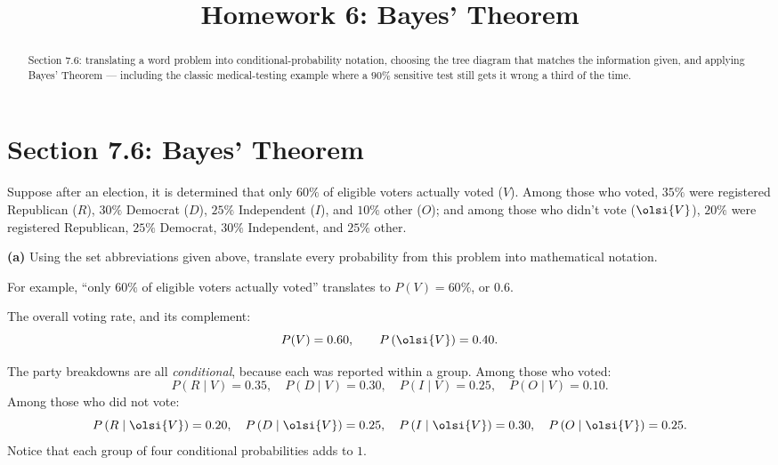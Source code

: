 \documentclass[12pt]{ximera}
\title{Homework 6: Bayes' Theorem}
\begin{document}
\begin{abstract}
Section 7.6: translating a word problem into conditional-probability notation,
choosing the tree diagram that matches the information given, and applying Bayes'
Theorem --- including the classic medical-testing example where a $90\%$ sensitive
test still gets it wrong a third of the time.
\end{abstract}
\maketitle

\section*{Section 7.6: Bayes' Theorem}

\begin{problem}
Suppose after an election, it is determined that only $60\%$ of eligible voters
actually voted ($V$). Among those who voted, $35\%$ were registered Republican
($R$), $30\%$ Democrat ($D$), $25\%$ Independent ($I$), and $10\%$ other ($O$);
and among those who didn't vote ($\olsi{V}$), $20\%$ were registered Republican,
$25\%$ Democrat, $30\%$ Independent, and $25\%$ other.

\begin{prompt}
\textbf{(a)} Using the set abbreviations given above, translate every probability
from this problem into mathematical notation.

For example, ``only $60\%$ of eligible voters actually voted'' translates to
$P(V)=60\%$, or $0.6$.

\begin{freeResponse}
\end{freeResponse}

\begin{solution}
The overall voting rate, and its complement:
\[ P(V)=0.60, \qquad P\left(\olsi{V}\right)=0.40. \]

The party breakdowns are all \emph{conditional}, because each was reported within a
group. Among those who voted:
\[
P(R\mid V)=0.35,\quad P(D\mid V)=0.30,\quad P(I\mid V)=0.25,\quad P(O\mid V)=0.10.
\]
Among those who did not vote:
\[
P\left(R\mid\olsi{V}\right)=0.20,\quad
P\left(D\mid\olsi{V}\right)=0.25,\quad
P\left(I\mid\olsi{V}\right)=0.30,\quad
P\left(O\mid\olsi{V}\right)=0.25.
\]
Notice that each group of four conditional probabilities adds to $1$.
\end{solution}
\end{prompt}


\end{problem}
\end{document}
